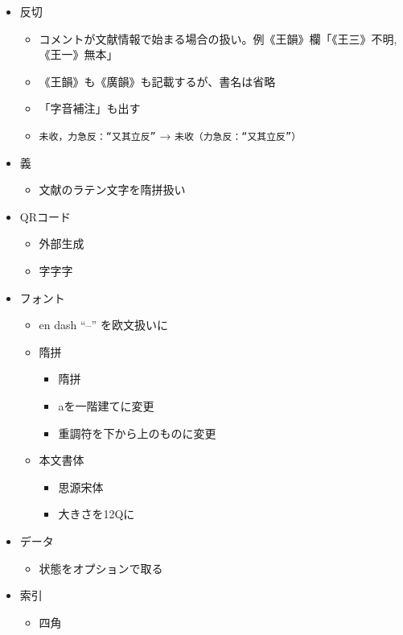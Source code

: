 \documentclass[a5paper]{article}
\begin{document}
\begin{itemize}
\begin{itemize}
\begin{itemize}
\begin{verbatim}
    (80 + 23)'
\end{verbatim}
    \end{itemize}
  \end{itemize}
\item{} 反切
  \begin{itemize}
  \item{} コメントが文献情報で始まる場合の扱い。例《王韻》欄「《王三》不明,《王一》無本」
  \item{} 《王韻》も《廣韻》も記載するが、書名は省略
  \item{} 「字音補注」も出す
  \item{}  \verb|未收，力急反：“又其立反”| → \verb|未收（力急反：“又其立反”）|
  \end{itemize}
\item{} 義
  \begin{itemize}
  \item{} 文献のラテン文字を隋拼扱い
  \end{itemize}
\item{} QRコード
  \begin{itemize}
  \item{} 外部生成
  \item{} 字字字
  \end{itemize}
\item{} フォント
  \begin{itemize}
  \item{} en dash “–” を欧文扱いに
  \item{} 隋拼
    \begin{itemize}
    \item{} 隋拼
    \item{} aを一階建てに変更
    \item{} 重調符を下から上のものに変更
    \end{itemize}
  \item{} 本文書体
    \begin{itemize}
    \item{} 思源宋体
    \item{} 大きさを12Qに
    \end{itemize}
  \end{itemize}
\item{} データ
  \begin{itemize}
  \item{} 状態をオプションで取る
  \end{itemize}
\item{} 索引
  \begin{itemize}
  \item{} 四角

\end{itemize}
\end{itemize}
\end{document}
